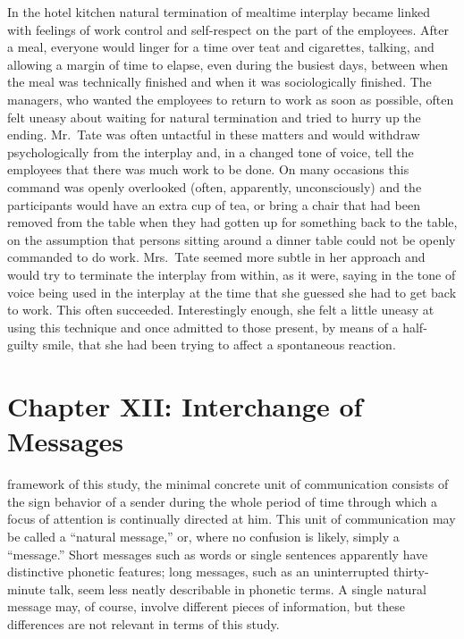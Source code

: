 \documentclass[twoside,symmetric,nobib,justified]{tufte-book}
\let\oldchapter\chapter
\def\chapter{%
  \setcounter{footnote}{0}%
  \oldchapter
}
\begin{document}
In the hotel kitchen natural termination of mealtime interplay became
linked with feelings of work control and self-respect on the part of the
employees. After a meal, everyone would linger for a time over teat and
cigarettes, talking, and allowing a margin of time to elapse, even
during the busiest days, between when the meal was technically finished
and when it was sociologically finished. The managers, who wanted the
employees to return to work as soon as possible, often felt uneasy about
waiting for natural termination and tried to hurry up the ending.
Mr.~Tate was often untactful in these matters and would withdraw
psychologically from the interplay and, in a changed tone of voice, tell
the employees that there was much work to be done. On many occasions
this command was openly overlooked (often, apparently, unconsciously)
and the participants would have an extra cup of tea, or bring a chair
that had been removed from the table when they had gotten up for
something back to the table, on the assumption that persons sitting
around a dinner table could not be openly commanded to do work.
Mrs.~Tate seemed more subtle in her approach and would try to terminate
the interplay from within, as it were, saying in the tone of voice being
used in the interplay at the time that she guessed she had to get back
to work. This often succeeded. Interestingly enough, she felt a little
uneasy at using this technique and once admitted to those present, by
means of a half-guilty smile, that she had been trying to affect a
spontaneous reaction.

\chapter[CHAPTER XII: INTERCHANGE OF MESSAGES]{Chapter XII: Interchange of Messages}
\label{ch:Chapter XII: Interchange of Messages}

 framework of this study, the minimal concrete unit of
communication consists of the sign behavior of a sender during the whole
period of time through which a focus of attention is continually
directed at him. This unit of communication may be called a ``natural
message,'' or, where no confusion is likely, simply a ``message.'' Short
messages such as words or single sentences apparently have distinctive
phonetic features; long messages, such as an uninterrupted thirty-minute
talk, seem less neatly describable in phonetic terms. A single natural
message may, of course, involve different pieces of information, but
these differences are not relevant in terms of this study.
\end{document}
